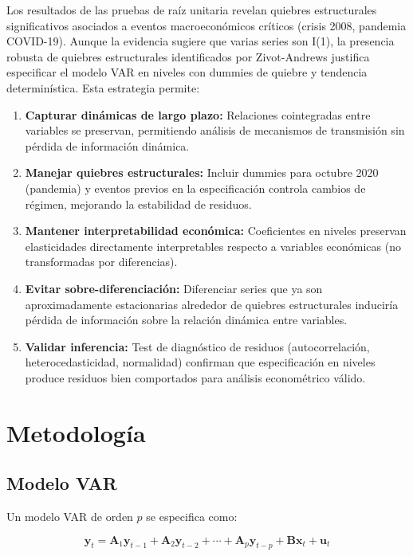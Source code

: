 \documentclass[12pt,a4paper]{article}
\begin{document}
Los resultados de las pruebas de raíz unitaria revelan quiebres estructurales significativos asociados a eventos macroeconómicos críticos (crisis 2008, pandemia COVID-19). Aunque la evidencia sugiere que varias series son I(1), la presencia robusta de quiebres estructurales identificados por Zivot-Andrews justifica especificar el modelo VAR en niveles con dummies de quiebre y tendencia determinística. Esta estrategia permite:

\begin{enumerate}
\item \textbf{Capturar dinámicas de largo plazo:} Relaciones cointegradas entre variables se preservan, permitiendo análisis de mecanismos de transmisión sin pérdida de información dinámica.

\item \textbf{Manejar quiebres estructurales:} Incluir dummies para octubre 2020 (pandemia) y eventos previos en la especificación controla cambios de régimen, mejorando la estabilidad de residuos.

\item \textbf{Mantener interpretabilidad económica:} Coeficientes en niveles preservan elasticidades directamente interpretables respecto a variables económicas (no transformadas por diferencias).

\item \textbf{Evitar sobre-diferenciación:} Diferenciar series que ya son aproximadamente estacionarias alrededor de quiebres estructurales induciría pérdida de información sobre la relación dinámica entre variables.

\item \textbf{Validar inferencia:} Test de diagnóstico de residuos (autocorrelación, heterocedasticidad, normalidad) confirman que especificación en niveles produce residuos bien comportados para análisis econométrico válido.
\end{enumerate}

\section{Metodología}
\label{sec:metodologia}

\subsection{Modelo VAR}

Un modelo VAR de orden $p$ se especifica como:

\begin{equation}
\mathbf{y}_t = \mathbf{A}_1 \mathbf{y}_{t-1} + \mathbf{A}_2 \mathbf{y}_{t-2} + \cdots + \mathbf{A}_p \mathbf{y}_{t-p} + \mathbf{B}\mathbf{x}_t + \mathbf{u}_t
\end{equation}
\end{document}
